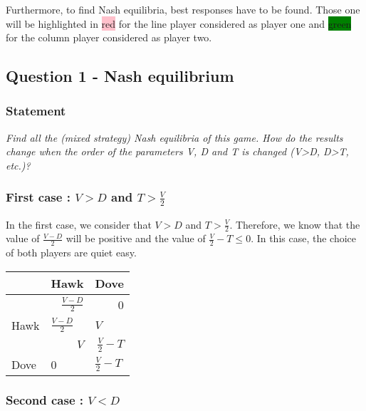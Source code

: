 \documentclass{article}
\begin{document}
Furthermore, to find Nash equilibria, best responses have to be found. Those one will be highlighted in \colorbox{pink}{red} for the line player considered as player one and \colorbox{green}{green} for the column player considered as player two. 

\subsection{Question 1 - Nash equilibrium}

\subsubsection*{Statement} 
\noindent
\textit{ Find all the (mixed strategy) Nash equilibria of this game. How do the results change when the order of the parameters V, D and T is changed (V>D, D>T, etc.)?}

\subsubsection{First case : $V>D$ and $T>\frac{V}{2}$} 

In the first case, we consider that $V>D$ and $T>\frac{V}{2}$. Therefore, we know that the value of $\frac{V-D}{2}$ will be positive and the value of $\frac{V}{2}-T \le 0$. In this case, the choice of both players are quiet easy. 


\begin{center}
\begin{tabular}{|l|r|r|}
  \hline
  			   & Hawk & Dove \\
  \hline
  		   & \hspace{1cm} $\frac{V-D}{2}$ & 0 \\
  	Hawk &	\multicolumn{1}{|l|}{$\frac{V-D}{2}$}		& 	\multicolumn{1}{|l|}{$V$ }		\\
  \hline
    		   & \multicolumn{1}{|r|}{$V$} & \hspace{1cm} $\frac{V}{2}-T$  \\
  Dove &	\multicolumn{1}{|l|}{0}		& 	\multicolumn{1}{|l|}{$\frac{V}{2}-T$}		\\
  \hline
\end{tabular}
\label{table:payoffMatrix-case1}
\end{center}

\subsubsection{Second case : $V<D$}
\end{document}
